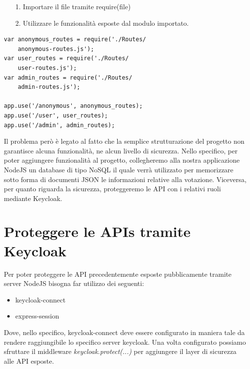 \documentclass[twoside]{report}
\begin{document}
\begin{itemize}
    \item[1.] Importare il file tramite require(file)
    \item[2.] Utilizzare le funzionalità esposte dal modulo importato.
\end{itemize}


\begin{listing}[h!]
\begin{verbatim}
var anonymous_routes = require('./Routes/
    anonymous-routes.js');
var user_routes = require('./Routes/
    user-routes.js');
var admin_routes = require('./Routes/
    admin-routes.js');

app.use('/anonymous', anonymous_routes);
app.use('/user', user_routes);
app.use('/admin', admin_routes);

\end{verbatim}
\end{listing}
\FloatBarrier

Il problema però è legato al fatto che la semplice strutturazione del progetto non garantisce alcuna funzionalità, ne alcun livello di sicurezza.
\bigbreak
Nello specifico, per poter aggiungere funzionalità al progetto, collegheremo alla nostra applicazione NodeJS un database di tipo NoSQL il quale verrà utilizzato per memorizzare sotto forma di documenti JSON le informazioni relative alla votazione.
\bigbreak
Viceversa, per quanto riguarda la sicurezza, proteggeremo le API con i relativi ruoli mediante Keycloak.

\section{Proteggere le APIs tramite Keycloak}

Per poter proteggere le API precedentemente esposte pubblicamente tramite server NodeJS bisogna far utilizzo dei seguenti:

\begin{itemize}
    \item keycloak-connect
    \item express-session
\end{itemize}

Dove, nello specifico, keycloak-connect deve essere configurato in maniera tale da rendere raggiungibile lo specifico server keycloak. Una volta configurato possiamo sfruttare il middleware \textit{keycloak.protect(...)} per aggiungere il layer di sicurezza alle API esposte.
\end{document}
